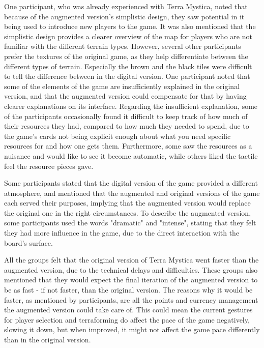 One participant, who was already experienced with Terra Mystica, noted that because of the augmented version’s simplistic design, they saw potential in it being used to introduce new players to the game. It was also mentioned that the simplistic design provides a clearer overview of the map for players who are not familiar with the different terrain types. However, several other participants prefer the textures of the original game, as they help differentiate between the different types of terrain. Especially the brown and the black tiles were difficult to tell the difference between in the digital version. One participant noted that some of the elements of the game are insufficiently explained in the original version, and that the augmented version could compensate for that by having clearer explanations on its interface. Regarding the insufficient explanation, some of the participants occasionally found it difficult to keep track of how much of their resources they had, compared to how much they needed to spend, due to the game's cards not being explicit enough about what you need specific resources for and how one gets them. Furthermore, some saw the resources as a nuisance and would like to see it become automatic, while others liked the tactile feel the resource pieces gave.

Some participants stated that the digital version of the game provided a different atmosphere, and mentioned that the augmented and original versions of the game each served their purposes, implying that the augmented version would replace the original one in the right circumstances. To describe the augmented version, some participants used the words "dramatic" and "intense", stating that they felt they had more influence in the game, due to the direct interaction with the board’s surface.

All the groups felt that the original version of Terra Mystica went faster than the augmented version, due to the technical delays and difficulties. These groups also mentioned that they would expect the final iteration of the augmented version to be as fast - if not faster, than the original version. The reasons why it would be faster, as mentioned by participants, are all the points and currency management the augmented version could take care of. This could mean the current gestures for player selection and terraforming do affect the pace of the game negatively, slowing it down, but when improved, it might not affect the game pace differently than in the original version.

